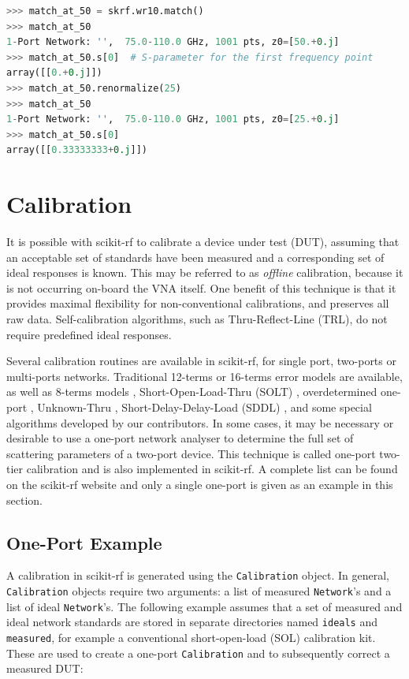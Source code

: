 \documentclass[10pt, letterpaper]{scrartcl}
\newcommand{\skrf}{{s}cikit-rf\xspace}
\begin{document}
\begin{lstlisting}[language=Python]
>>> match_at_50 = skrf.wr10.match()
>>> match_at_50
1-Port Network: '',  75.0-110.0 GHz, 1001 pts, z0=[50.+0.j]
>>> match_at_50.s[0]  # S-parameter for the first frequency point
array([[0.+0.j]])
>>> match_at_50.renormalize(25)
>>> match_at_50
1-Port Network: '',  75.0-110.0 GHz, 1001 pts, z0=[25.+0.j]
>>> match_at_50.s[0]
array([[0.33333333+0.j]])
\end{lstlisting}

\section{Calibration}
It is possible with \skrf{} to calibrate a device under test (DUT), assuming that an acceptable set of standards have been measured and a corresponding set of ideal responses is known. This may be referred to as \textit{offline} calibration, because it is not occurring on-board the VNA itself. One benefit of this technique is that it provides maximal flexibility for non-conventional calibrations, and preserves all raw data. Self-calibration algorithms, such as Thru-Reflect-Line (TRL)\cite{engen1979}, do not require predefined ideal responses.

Several calibration routines are available in \skrf{}, for single port, two-ports or multi-ports networks. Traditional 12-terms \cite{marks1997} or 16-terms \cite{silvonen1993} error models are available, as well as 8-terms models \cite{speciale1977}, Short-Open-Load-Thru (SOLT) \cite{kruppa1971}, overdetermined one-port \cite{bauer1974}, Unknown-Thru \cite{ferrero1992}, Short-Delay-Delay-Load (SDDL) \cite{liu2006}, and some special algorithms developed by our contributors. In some cases, it may be necessary or desirable to use a one-port network analyser to determine the full set of scattering parameters of a two-port device. This technique is called one-port two-tier calibration \cite{ou2005} and is also implemented in \skrf{}. A complete list can be found on the \skrf{} website and only a single one-port is given as an example in this section.

\subsection{One-Port Example}
A calibration in \skrf{} is generated using the \texttt{Calibration} object. In general, \texttt{Calibration} objects require two arguments: a list of measured \texttt{Network}’s and a list of ideal \texttt{Network}’s. The following example assumes that a set of measured and ideal network standards are stored in separate directories named \texttt{ideals} and \texttt{measured}, for example a conventional short-open-load (SOL) calibration kit. These are used to create a one-port \texttt{Calibration} and to subsequently correct a measured DUT:
\end{document}
